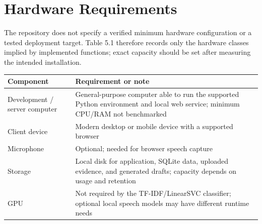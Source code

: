 \documentclass[12pt,a4paper,oneside]{report}
\begin{document}
\section{Hardware Requirements}
The repository does not specify a verified minimum hardware configuration or a tested deployment target. Table 5.1 therefore records only the hardware classes implied by implemented functions; exact capacity should be set after measuring the intended installation.\par\medskip
{}
\begin{longtable}{|>{\RaggedRight\arraybackslash}p{}|>{\RaggedRight\arraybackslash}p{}|}
\hline
\textbf{Component} & \textbf{Requirement or note} \\\hline
Development / server computer & General-purpose computer able to run the supported Python environment and local web service; minimum CPU/RAM not benchmarked \\\hline
Client device & Modern desktop or mobile device with a supported browser \\\hline
Microphone & Optional; needed for browser speech capture \\\hline
Storage & Local disk for application, SQLite data, uploaded evidence, and generated drafts; capacity depends on usage and retention \\\hline
GPU & Not required by the TF-IDF/LinearSVC classifier; optional local speech models may have different runtime needs \\\hline
\end{longtable}
\vspace{2mm}
\end{document}
